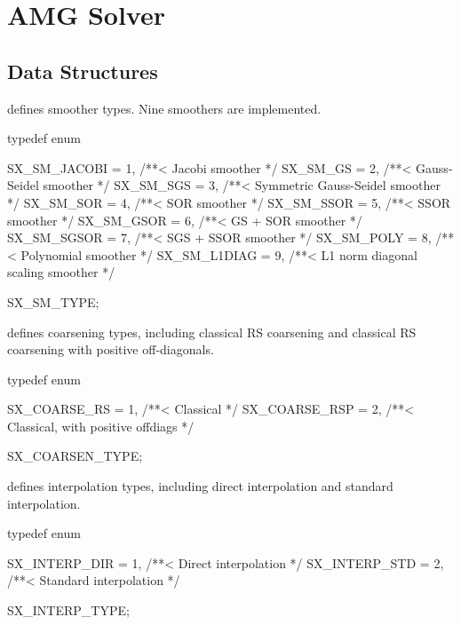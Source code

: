 \chapter{AMG Solver}

\section{Data Structures}

 defines smoother types. Nine smoothers are implemented.
\begin{evb}
typedef enum
{
    SX_SM_JACOBI    = 1,  /**< Jacobi smoother */
    SX_SM_GS        = 2,  /**< Gauss-Seidel smoother */
    SX_SM_SGS       = 3,  /**< Symmetric Gauss-Seidel smoother */
    SX_SM_SOR       = 4,  /**< SOR smoother */
    SX_SM_SSOR      = 5,  /**< SSOR smoother */
    SX_SM_GSOR      = 6,  /**< GS + SOR smoother */
    SX_SM_SGSOR     = 7,  /**< SGS + SSOR smoother */
    SX_SM_POLY      = 8,  /**< Polynomial smoother */
    SX_SM_L1DIAG    = 9,  /**< L1 norm diagonal scaling smoother */

} SX_SM_TYPE;
\end{evb}

 defines coarsening types, including classical RS coarsening and
classical RS coarsening with positive off-diagonals.
\begin{evb}
typedef enum
{
    SX_COARSE_RS      = 1,  /**< Classical */
    SX_COARSE_RSP     = 2,  /**< Classical, with positive offdiags */

} SX_COARSEN_TYPE;
\end{evb}


 defines interpolation types, including direct interpolation
and standard interpolation.
\begin{evb}
typedef enum
{
    SX_INTERP_DIR     = 1,  /**< Direct interpolation */
    SX_INTERP_STD     = 2,  /**< Standard interpolation */

} SX_INTERP_TYPE;
\end{evb}


